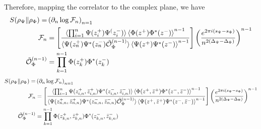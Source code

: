 \documentclass[11pt]{article}
\newcommand{\p}{\partial}
\newcommand{\mO}{\mathcal{O}}
\newcommand{\nn}{\nonumber}
\newcommand{\lb}{\left(}
\newcommand{\rb}{\right)}
\newcommand{\NL}[1]{\textcolor{blue}{#1}}
\begin{document}
Therefore, mapping the correlator to the complex plane, we have 
\begin{align}
  S(\rho_\Psi\|\rho_\Phi)=&\lb\p_n\log\mathcal{F}_n\rb_{n=1}\nn\\
  \mathcal{F}_n&=\left[\frac{\braket{\prod_{i=1}^{n} \Psi (z^+_i)\Psi^(z^-_i)}\braket{\Phi(z^+)\Phi^*(z^-)}^{n-1}}{\braket{\Psi(z^+_n)\Psi^*(z^-_n)\tilde{\mO}^{(n-1)}_{\Phi}}\braket{\Psi(z^+)\Psi^*(z^-)}^{n-1}}\right]\lb \frac{e^{2\pi i (s_\Psi-s_\Phi)}}{n^{2(\Delta_\Psi-\Delta_\Phi)}}\rb^{n-1}\label{fncorrspin}\\
  \tilde{\mO}^{(n-1)}_\Phi&= \prod_{k=1}^{n-1} \Phi(z^+_k)\Phi^*(z^-_k)
\end{align}
\begin{align}
  S(\rho_\Psi\|\rho_\Phi)=&\lb\p_n\log\mathcal{F}_n\rb_{n=1}\nn\\
  \mathcal{F}_n&=\left[\frac{\braket{\prod_{i=1}^{n} \Psi(z^+_{i,n},\bar z^+_{i,n})\Psi^*(z^-_{i,n},\bar z^-_{i,n})}\braket{\Phi(z^+,\bar z^+)\Phi^*(z^-,\bar z^-)}^{n-1}}{\braket{\Psi(z^+_{n,n}, \bar z^+_{n,n})\Psi^*(z^-_{n,n}, \bar z^-_{n,n})\tilde{\mO}^{(n-1)}_{\Phi}}\braket{\Psi(z^+,\bar z^+)\Psi^*(z^-,\bar z^-)}^{n-1}}\right]\lb \frac{e^{2\pi i (s_\Psi-s_\Phi)}}{n^{2(\Delta_\Psi-\Delta_\Phi)}}\rb^{n-1}\label{fncorrspin}\\
  \tilde{\mO}^{(n-1)}_\Phi&= \prod_{k=1}^{n-1} \Phi(z^+_{k,n},\bar z^+_{k,n})\Phi^*(z^-_{k,n},\bar z^-_{k,n})
\end{align}
\end{document}
